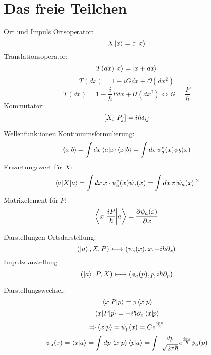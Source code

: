 \section{Das freie Teilchen}

\begin{subbox}{Ort und Impuls}
Ortsoperator:
\[ X \ket{x} = x \ket{x} \]
Translationsoperator:
\[ T(dx) \ket{x} = \ket{x + dx}\]
\[ T(dx) = 1 - i G dx + \mathcal{O}(dx^2) \]
\[ T(dx) = 1 - \frac{i}{\hbar} P dx + \mathcal{O}(dx^2) \Longleftrightarrow G = \frac{P}{\hbar} \] %
Kommutator:
\[ \comm{X_i}{P_j} = i\hbar \delta_{ij} \]
\end{subbox}

\begin{subbox}{Wellenfunktionen}
Kontinuumsformulierung:
\[ \braket{a}{b} = \int dx  \braket{a}{x} \braket{x}{b} = \int dx \,\psi_a^*(x)\psi_b(x) \]
Erwartungswert für $X$:
\[ \ev{X}{a} = \int dx \, x \cdot \psi_a^*(x) \psi_a(x) = \int dx \, x |\psi_a(x)|^2 \]
Matrixelement für $P$:
\[ \mel**{x}{\frac{iP}{\hbar}}{a} = \frac{\partial \psi_a(x)}{\partial x} \]
\end{subbox}

\begin{mainbox}{Darstellungen}
Ortsdarstellung: 
\[ (\ket{a}, X, P) \longleftrightarrow (\psi_a(x), x, -i\hbar\partial_x) \]
Impulsdarstellung:
\[ (\ket{a}, P, X) \longleftrightarrow (\phi_a(p), p, i\hbar\partial_p) \]

Darstellungswechsel:
\[ \mel{x}{P}{p} =  p \braket{x}{p} \]
\[ \mel{x}{P}{p} = -i\hbar \partial_x \braket{x}{p} \]
\[ \Rightarrow \braket{x}{p} = \psi_p(x) = C e^{\frac{ipx}{\hbar}} \]
\[ \psi_a(x) = \braket{x}{a} = \int dp \, \braket{x}{p} \braket{p}{a} = \int \, \frac{dp}{\sqrt{2\pi \hbar}} e^{\frac{ipx}{\hbar}} \phi_a(p) \]

\end{mainbox}